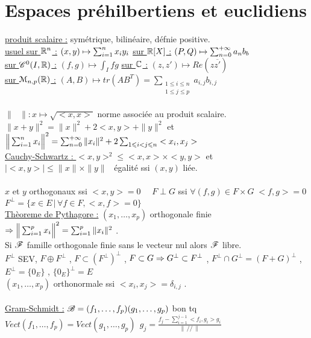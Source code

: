 \documentclass[12 pt]{exampleclass}
\begin{document}
\section{Espaces préhilbertiens et euclidiens}
\underline{produit scalaire :} symétrique, bilinéaire, défnie positive.\\
\underline{usuel sur $\mathbb{R}^n$ :} $(x,y) \mapsto \sum_{i=1}^n x_i y_i$ \qquad \qquad \underline{sur $\mathbb{R}[X]$ :} $(P,Q) \mapsto \sum_{n=0}^{+\infty} a_n b_b$ \\
\underline{sur $\mathscr{C}^0(I,\mathbb{R})$ :} $(f,g) \mapsto \int_I fg$ \qquad \qquad \underline{sur $\mathbb{C}$ :} $(z,z') \mapsto Re(z\overline{z'})$\\
\underline{sur $\mathcal{M}_{n,p}(\mathbb{R})$ :} $(A,B)\mapsto tr(AB^T) = \sum_{\substack{1\leqslant i \leqslant n \\ 1\leqslant j \leqslant p}} a_{i,j} b_{i,j}$\\
\text{}\\
$\|\text{ }\| : x\mapsto \sqrt{<x,x>}$ norme associée au produit scalaire.\\
$\|x+y\|^2 = \|x\|^2+2<x,y>+\|y\|^2$  et  $\Big\| \sum_{i=1}^n x_i\Big\|^2 = \sum_{n=0}^{+\infty} \|x_i\|^2 + 2 \sum_{1\leqslant i<j\leqslant n} <x_i,x_j>$\\
\underline{Cauchy-Schwartz : } $<x,y>^2 \leqslant <x,x>\times <y,y>$ et $|<x,y>|\leqslant \|x\| \times \|y\|$ \ égalité ssi $(x,y)$ liée.\\
\text{}\\
$x$ et $y$ orthogonaux ssi $<x,y> =0$ \ \ $F\perp G$ ssi $\forall (f,g)\in F\times G  \; <f,g>=0$ \\ $F^\perp = \{x\in E \, | \, \forall f\in F, <x,f>=0\}$\\
\underline{Thèoreme de Pythagore :} $(x_1,\dots,x_p)$ orthogonale finie $\Rightarrow  \Big\| \sum_{i=1}^p x_i \Big\|^2 = \sum_{i=1}^p \| x_i\|^2$ .\\
Si $\mathscr{F}$ famille orthogonale finie sans le vecteur nul alors $\mathscr{F}$ libre.\\
$F^\perp$ SEV, $F\oplus F^\perp$ , $F\subset(F^\perp)^\perp$ , $F\subset G \Rightarrow G^\perp \subset F^\perp$ , $F^\perp \cap G^\perp = (F+G)^\perp$ , $E^\perp = \{0_E\}$ , $\{0_E\}^\perp = E$\\
$(x_1,\dots,x_p)$ orthonormale ssi $<x_i,x_j> = \delta_{i,j}$ .\\
\text{}\\
\underline{Gram-Schmidt :} $ \mathscr{B} = (f_1,\dots,f_p)\\
(g_1,\dots,g_p)$ bon tq $Vect(f_1,\dots,f_p) = Vect(g_1,\dots,g_p) \ \ g_j = \frac{\displaystyle f_j - \sum_{i=1}^{j-1} <f_i,g_i> g_i}{\|\, // \,\|}$\\
\end{document}
